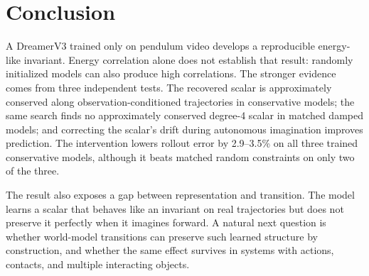 \section{Conclusion}

A DreamerV3 trained only on pendulum video develops a reproducible energy-like invariant. Energy
correlation alone does not establish that result: randomly initialized models can also produce high
correlations. The stronger evidence comes from three independent tests. The recovered scalar is
approximately conserved along observation-conditioned trajectories in conservative models; the same
search finds no approximately conserved degree-4 scalar in matched damped models; and correcting the
scalar's drift during autonomous imagination improves prediction. The intervention lowers rollout
error by 2.9--3.5\% on all three trained conservative models, although it beats matched random
constraints on only two of the three.

The result also exposes a gap between representation and transition. The model learns a scalar that
behaves like an invariant on real trajectories but does not preserve it perfectly when it imagines
forward. A natural next question is whether world-model transitions can preserve such learned
structure by construction, and whether the same effect survives in systems with actions, contacts,
and multiple interacting objects.
